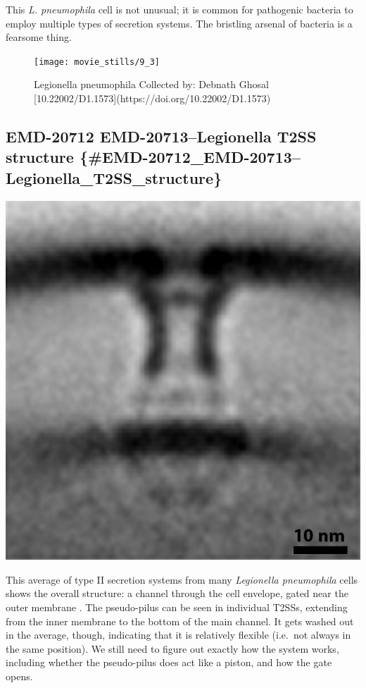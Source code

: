 \documentclass[]{tufte-book}
\begin{document}
This \emph{L. pneumophila} cell is not unusual; it is common for
pathogenic bacteria to employ multiple types of secretion systems. The
bristling arsenal of bacteria is a fearsome thing.

\begin{figure}
\texttt{[image: movie\_stills/9\_3]} \caption[Legionella pneumophila Collected by]{Legionella pneumophila Collected by: Debnath Ghosal [10.22002/D1.1573](https://doi.org/10.22002/D1.1573)}\label{fig:unnamed-chunk-153}
\end{figure}

\subsection{EMD-20712 EMD-20713--Legionella T2SS structure
\{\#EMD-20712\_EMD-20713--Legionella\_T2SS\_structure\}}\label{emd-20712-emd-20713legionella-t2ss-structure-emd-20712_emd-20713legionella_t2ss_structure}

\includegraphics{img/schematics/9_3_1}

This average of type II secretion systems from many \emph{Legionella
pneumophila} cells shows the overall structure: a channel through the
cell envelope, gated near the outer membrane \citet{ghosal2019}. The
pseudo-pilus can be seen in individual T2SSs, extending from the inner
membrane to the bottom of the main channel. It gets washed out in the
average, though, indicating that it is relatively flexible (i.e.~not
always in the same position). We still need to figure out exactly how
the system works, including whether the pseudo-pilus does act like a
piston, and how the gate opens.
\end{document}
